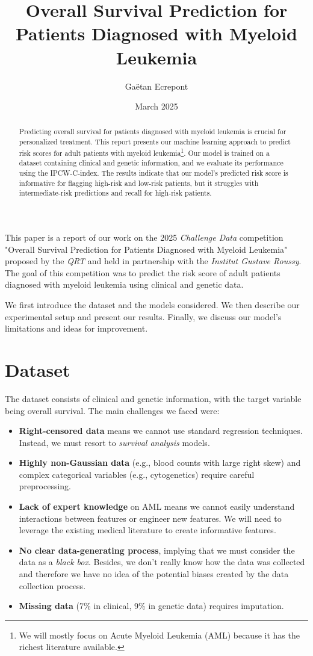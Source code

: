 \documentclass{article}
\title{Overall Survival Prediction for Patients Diagnosed with Myeloid Leukemia}
\author{Gaëtan Ecrepont}
\date{March 2025}
\begin{document}
\maketitle

\begin{abstract}
Predicting overall survival for patients diagnosed with myeloid leukemia is crucial for personalized treatment. This report presents our machine learning approach to predict risk scores for adult patients with myeloid leukemia\footnote{We will mostly focus on Acute Myeloid Leukemia (AML) because it has the richest literature available.}. Our model is trained on a dataset containing clinical and genetic information, and we evaluate its performance using the IPCW-C-index. The results indicate that our model's predicted risk score is informative for flagging high-risk and low-risk patients, but it struggles with intermediate-risk predictions and recall for high-risk patients.
\end{abstract}

\tableofcontents
\newpage

This paper is a report of our work on the 2025 \textit{Challenge Data} competition "Overall Survival Prediction for Patients Diagnosed with Myeloid Leukemia" proposed by the \textit{QRT} and held in partnership with the \textit{Institut Gustave Roussy}. The goal of this competition was to predict the risk score of adult patients diagnosed with myeloid leukemia using clinical and genetic data.

We first introduce the dataset and the models considered. We then describe our experimental setup and present our results. Finally, we discuss our model's limitations and ideas for improvement.

\section{Dataset}
The dataset consists of clinical and genetic information, with the target variable being overall survival. The main challenges we faced were:
\begin{itemize}
    \item \textbf{Right-censored data} means we cannot use standard regression techniques. Instead, we must resort to \textit{survival analysis} models.
    \item \textbf{Highly non-Gaussian data} (e.g., blood counts with large right skew) and complex categorical variables (e.g., cytogenetics) require careful preprocessing.
    \item \textbf{Lack of expert knowledge} on AML means we cannot easily understand interactions between features or engineer new features. We will need to leverage the existing medical literature to create informative features.
    \item \textbf{No clear data-generating process}, implying that we must consider the data as a \textit{black box}. Besides, we don't really know how the data was collected and therefore we have no idea of the potential biases created by the data collection process.
    \item \textbf{Missing data} (7\% in clinical, 9\% in genetic data) requires imputation.
\end{itemize}
\end{document}
